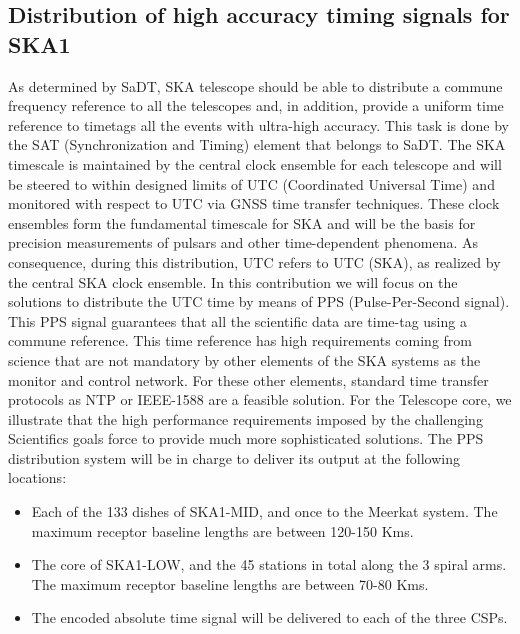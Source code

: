 \documentclass[review]{elsarticle}
\begin{document}
\subsection{Distribution of high accuracy timing signals for SKA1}

As determined by SaDT, SKA telescope should be able to distribute a commune frequency reference to all the telescopes and, in addition, provide a uniform time reference to timetags all the events with ultra-high accuracy. This task is done by the SAT (Synchronization and Timing) element that belongs to SaDT. The SKA timescale is maintained by the central clock ensemble for each telescope and will be steered to within designed limits of UTC (Coordinated Universal Time) and monitored with respect to UTC via GNSS time transfer techniques. These clock ensembles form the fundamental timescale for SKA and will be the basis for precision measurements of pulsars and other time-dependent phenomena. As consequence, during this distribution, UTC refers to UTC (SKA), as realized by the central SKA clock ensemble.
In this contribution we will focus on the solutions to distribute the UTC time by means of PPS (Pulse-Per-Second signal). This PPS signal guarantees that all the scientific data are time-tag using a commune reference. This time reference has high requirements coming from science that are not mandatory by other elements of the SKA systems as the monitor and control network. For these other elements, standard time transfer protocols as NTP or IEEE-1588 are a feasible solution. For the Telescope core, we illustrate that the high performance requirements imposed by the challenging Scientifics goals force to provide much more sophisticated solutions. 
The PPS distribution system will be in charge to deliver its output at the following locations:

\begin{itemize}
	\item {Each of the 133 dishes of SKA1-MID, and once to the Meerkat system. The maximum receptor baseline lengths are between 120-150 Kms.}
	\item {The core of SKA1-LOW, and the 45 stations in total along the 3 spiral arms. The maximum receptor baseline lengths are between 70-80 Kms. }
	\item {The encoded absolute time signal will be delivered to each of the three CSPs.}
\end{itemize}
 
\end{document}
